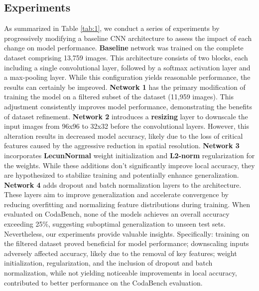 \documentclass[11pt]{template}
\begin{document}
\begin{multicols}{2}
\section{Experiments}
As summarized in Table \ref{tab:1}, we conduct a series of experiments by progressively modifying a baseline CNN architecture to assess the impact of each change on model performance.\newline
\textbf {Baseline} network was trained on the complete dataset comprising 13,759 images. This architecture consists of two blocks, each including a single convolutional layer, followed by a softmax activation layer and a max-pooling layer. While this configuration yields reasonable performance, the results can certainly be improved.\newline
\textbf{Network 1} has the primary modification of training the model on a filtered subset of the dataset (11,959 images). This adjustment consistently improves model performance, demonstrating the benefits of dataset refinement.\newline
\textbf{Network 2} introduces a \textbf{resizing} layer to downscale the input images from 96x96 to 32x32 before the convolutional layers. However, this alteration results in decreased model accuracy, likely due to the loss of critical features caused by the aggressive reduction in spatial resolution.\newline
\textbf{Network 3} incorporates \textbf{LecunNormal} weight initialization and \textbf{L2-norm} regularization for the weights. While these additions don't significantly improve local accuracy, they are hypothesized to stabilize training and potentially enhance generalization.\newline
\textbf{Network 4} adds dropout and batch normalization layers to the architecture. These layers aim to improve generalization and accelerate convergence by reducing overfitting and normalizing feature distributions during training.\newline
When evaluated on CodaBench, none of the models achieves an overall accuracy exceeding 25\%, suggesting suboptimal generalization to unseen test sets. Nevertheless, our experiments provide valuable insights. Specifically: training on the filtered dataset proved beneficial for model performance; downscaling inputs adversely affected accuracy, likely due to the removal of key features; weight initialization, regularization, and the inclusion of dropout and batch normalization, while not yielding noticeable improvements in local accuracy, contributed to better performance on the CodaBench evaluation.

\end{multicols}
\end{document}
